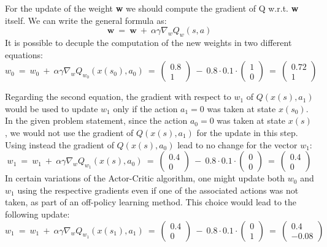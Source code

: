 \documentclass[10pt,a4paper]{article}
\begin{document}
\noindent For the update of the weight \textbf{w} we should compute the gradient of Q w.r.t. \textbf{w} itself. We can write the general formula as:
\begin{equation} 
    \mathbf{w} \:=\: \mathbf{w} \:+\: \alpha \gamma \nabla_{w} Q_{w} (s,a) 
\end{equation}
It is possible to decuple the computation of the new weights in two different equations:
\begin{equation*}
    w_{0} \:=\: w_{0} \:+\: \alpha \gamma \nabla_{w} Q_{w_0} (x(s_0), a_0) \:=\: \begin{pmatrix} 0.8 \\ 1 \end{pmatrix} \:-\: 
    0.8 \cdot 0.1 \cdot \begin{pmatrix} 1 \\ 0\end{pmatrix} \:=\: \begin{pmatrix} 0.72 \\ 1\end{pmatrix}
\end{equation*}

\noindent Regarding the second equation, the gradient with respect to $w_1$ of $Q(x(s), a_1)$ would be used to update $w_{1}$ only if the action $a_1 = 0$ was taken at state $x(s_0)$. In the given problem statement, since the action $a_0 = 0$ was taken at state $x(s)$, we would not use the gradient of $Q(x(s), a_1)$  for the update in this step. Using instead the gradient of $Q(x(s), a_0)$ lead to no change for the vector $w_1$:
\begin{equation*}
    w_{1} \:=\: w_{1} \:+\: \alpha \gamma \nabla_{w} Q_{w_1} (x(s), a_0) \:=\: \begin{pmatrix} 0.4 \\ 0 \end{pmatrix} \:-\: 
    0.8 \cdot 0.1 \cdot \begin{pmatrix} 0 \\ 0\end{pmatrix} \:=\: \begin{pmatrix} 0.4 \\ 0\end{pmatrix}
\end{equation*}
In certain variations of the Actor-Critic algorithm, one might update both $w_0$ and $w_1$ using the respective gradients even if one of the associated actions was not taken, as part of an off-policy learning method. This choice would lead to the following update:
\begin{equation*}
    w_{1} \:=\: w_{1} \:+\: \alpha \gamma \nabla_{w} Q_{w_1} (x(s_1), a_1) \:=\: \begin{pmatrix} 0.4 \\ 0 \end{pmatrix} \:-\: 
    0.8 \cdot 0.1 \cdot \begin{pmatrix} 0 \\ 1\end{pmatrix} \:=\: \begin{pmatrix} 0.4 \\ -0.08\end{pmatrix}
\end{equation*}
\end{document}

